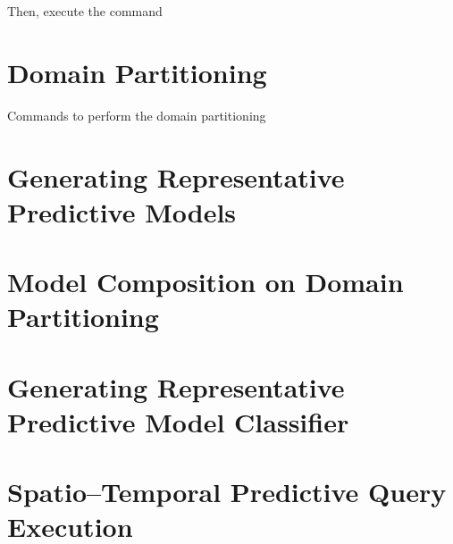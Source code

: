 Then, execute the command 

\section{Domain Partitioning}
\label{ap:domain_partititonig}

Commands to perform the domain partitioning

\section{Generating Representative Predictive Models}


\section{Model Composition on Domain Partitioning}


\section{Generating Representative Predictive Model Classifier}


\section{Spatio--Temporal Predictive Query Execution}

